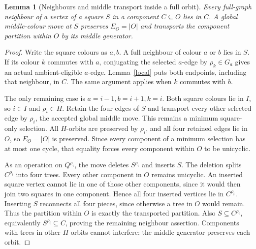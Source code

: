 \documentclass[11pt,a4paper]{article}
\newtheorem{lemma}{Lemma}
\begin{document}
\begin{lemma}[Neighbours and middle transport inside a full orbit]
\label{middle}
Every full-graph neighbour of a vertex of a square $S$
in a component $C\subseteq O$ lies in $C$. A global
middle-colour move at $S$ preserves $E_O=|O|$ and transports
the component partition within $O$ by its middle generator.
\end{lemma}
\begin{proof}
Write the square colours as $a,b$. A full neighbour of colour
$a$ or $b$ lies in $S$. If its colour $k$ commutes with $a$,
conjugating the selected $a$-edge by $\rho_k\in G_a$
gives an actual ambient-eligible $a$-edge. Lemma~\ref{local}
puts both endpoints, including that neighbour, in $C$.
The same argument applies when $k$ commutes with $b$.

The only remaining case is $a=i-1,b=i+1,k=i$. Both square
colours lie in $I$, so $i\in I$ and $\rho_i\in H$.
Retain the four edges of $S$ and transport every other
selected edge by $\rho_i$, the accepted global middle move.
This remains a minimum square-only selection. All $H$-orbits
are preserved by $\rho_i$, and all four retained edges lie
in $O$, so $E_O=|O|$ is preserved. Since every component of
a minimum selection has at most one cycle, that equality
forces every component within $O$ to be unicyclic.

As an operation on $Q^{\rho_i}$, the move deletes
$S^{\rho_i}$ and inserts $S$. The deletion splits
$C^{\rho_i}$ into four trees. Every other component in $O$
remains unicyclic. An inserted square vertex cannot lie in
one of those other components, since it would then join
two squares in one component. Hence all four inserted vertices
lie in $C^{\rho_i}$. Inserting $S$ reconnects all four
pieces, since otherwise a tree in $O$ would remain.
Thus the partition within $O$ is exactly the transported
partition. Also $S\subseteq C^{\rho_i}$, equivalently
$S^{\rho_i}\subseteq C$, proving the remaining neighbour
assertion. Components with trees in other $H$-orbits cannot
interfere: the middle generator preserves each orbit.
\end{proof}
\end{document}
